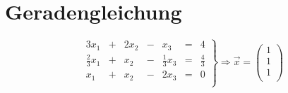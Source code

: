 \documentclass[fleqn,11pt,a4paper]{article}
\begin{document}
\section{Geradengleichung}

\[
\left.
\begin{array}{ccccccc}
3x_1 			& + & 	2x_2 	& - & 	x_3 			& = & 	4 				\\
\frac{2}{3}x_1 	& + & 	x_2 	& - & 	\frac{1}{3}x_3 	& = & 	\frac{4}{3}		\\
x_1 			& + & 	x_2 	& - & 	2x_3 			& = & 	0				\\
\end{array}
\right\rbrace
\Rightarrow\vec{x}=\left(\begin{array}{c}1\\1\\1\\\end{array}\right)
\]
\end{document}
